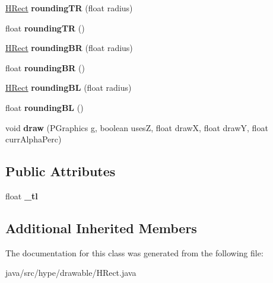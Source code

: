 \begin{DoxyCompactItemize}
\item 
\hypertarget{classhype_1_1drawable_1_1_h_rect_a45caa227a5f1d8d5c81b534ebed047e0}{\hyperlink{classhype_1_1drawable_1_1_h_rect}{H\-Rect} {\bfseries rounding\-T\-R} (float radius)}\label{classhype_1_1drawable_1_1_h_rect_a45caa227a5f1d8d5c81b534ebed047e0}

\item 
\hypertarget{classhype_1_1drawable_1_1_h_rect_a7c79febd61c038934a1b8018f519ccda}{float {\bfseries rounding\-T\-R} ()}\label{classhype_1_1drawable_1_1_h_rect_a7c79febd61c038934a1b8018f519ccda}

\item 
\hypertarget{classhype_1_1drawable_1_1_h_rect_a4a1cacf3d57d913d12bb556995f12892}{\hyperlink{classhype_1_1drawable_1_1_h_rect}{H\-Rect} {\bfseries rounding\-B\-R} (float radius)}\label{classhype_1_1drawable_1_1_h_rect_a4a1cacf3d57d913d12bb556995f12892}

\item 
\hypertarget{classhype_1_1drawable_1_1_h_rect_a096f9a60d0654c3fc05d51d5741b917e}{float {\bfseries rounding\-B\-R} ()}\label{classhype_1_1drawable_1_1_h_rect_a096f9a60d0654c3fc05d51d5741b917e}

\item 
\hypertarget{classhype_1_1drawable_1_1_h_rect_a52eda9ea544fe6feb1eeef50ac8d03e4}{\hyperlink{classhype_1_1drawable_1_1_h_rect}{H\-Rect} {\bfseries rounding\-B\-L} (float radius)}\label{classhype_1_1drawable_1_1_h_rect_a52eda9ea544fe6feb1eeef50ac8d03e4}

\item 
\hypertarget{classhype_1_1drawable_1_1_h_rect_a049a529b6800428757a8211107096ef6}{float {\bfseries rounding\-B\-L} ()}\label{classhype_1_1drawable_1_1_h_rect_a049a529b6800428757a8211107096ef6}

\item 
\hypertarget{classhype_1_1drawable_1_1_h_rect_a9eec0e9b23abc0ddf61c641d9de7f293}{void {\bfseries draw} (P\-Graphics g, boolean uses\-Z, float draw\-X, float draw\-Y, float curr\-Alpha\-Perc)}\label{classhype_1_1drawable_1_1_h_rect_a9eec0e9b23abc0ddf61c641d9de7f293}

\end{DoxyCompactItemize}
\subsection*{Public Attributes}
\begin{DoxyCompactItemize}
\item 
\hypertarget{classhype_1_1drawable_1_1_h_rect_a6f2696359b3f60a7c28cbb5d41ad6519}{float {\bfseries \-\_\-tl}}\label{classhype_1_1drawable_1_1_h_rect_a6f2696359b3f60a7c28cbb5d41ad6519}

\end{DoxyCompactItemize}
\subsection*{Additional Inherited Members}


The documentation for this class was generated from the following file\-:\begin{DoxyCompactItemize}
\item 
java/src/hype/drawable/H\-Rect.\-java\end{DoxyCompactItemize}
